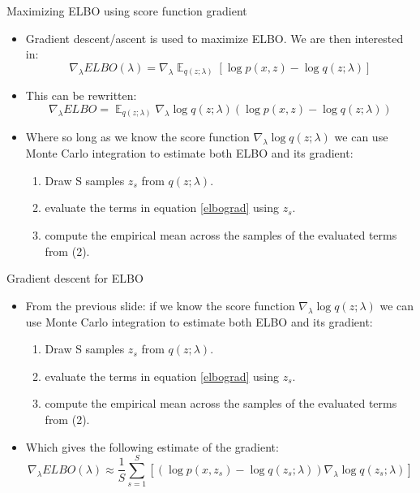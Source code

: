 \documentclass{beamer}
\begin{document}
\begin{frame}{Maximizing ELBO using score function gradient}
  \begin{itemize}
  \item Gradient descent/ascent is used to maximize ELBO. We are then interested in:
    \[\nabla_\lambda ELBO(\lambda) = \nabla_\lambda \mathop{\mathbb{E}}_{q(z ; \lambda)} \left[\log p(x, z) - \log q(z ; \lambda) \right]\]
  \item This can be rewritten:
    \begin{equation}
      \label{elbograd}
      \nabla_\lambda ELBO =  \mathop{\mathbb{E}}_{q(z ; \lambda)} \nabla_\lambda \log q(z ; \lambda) \left(\log p(x, z) - \log q(z ; \lambda) \right)
    \end{equation}
  \item Where so long as we know the score function $\nabla_\lambda \log q(z ; \lambda)$ we can use Monte Carlo integration to estimate both ELBO and its gradient:
    \begin{enumerate}
    \item Draw S samples $z_s$ from  $q(z ; \lambda)$.
    \item evaluate the terms in equation \ref{elbograd} using $z_s$.
    \item compute the empirical mean across the samples of the evaluated terms from (2).
    \end{enumerate}
  \end{itemize}
\end{frame}

\begin{frame}{Gradient descent for ELBO}
  \begin{itemize}
  \item From the previous slide: if we know the score function $\nabla_\lambda \log q(z ; \lambda)$ we can use Monte Carlo integration to estimate both ELBO and its gradient:
    \begin{enumerate}
    \item Draw S samples $z_s$ from  $q(z ; \lambda)$.
    \item evaluate the terms in equation \ref{elbograd} using $z_s$.
    \item compute the empirical mean across the samples of the evaluated terms from (2).
    \end{enumerate}
  \item  Which gives the following estimate of the gradient:
      \[\nabla_\lambda ELBO(\lambda) \approx \frac{1}{S} \sum_{s=1}^{S} \left[ \left( \log p(x, z_s) - \log q(z_s; \lambda)\right) \nabla_\lambda \log q(z_s; \lambda) \right]\]
  \end{itemize}
\end{frame}
\end{document}
